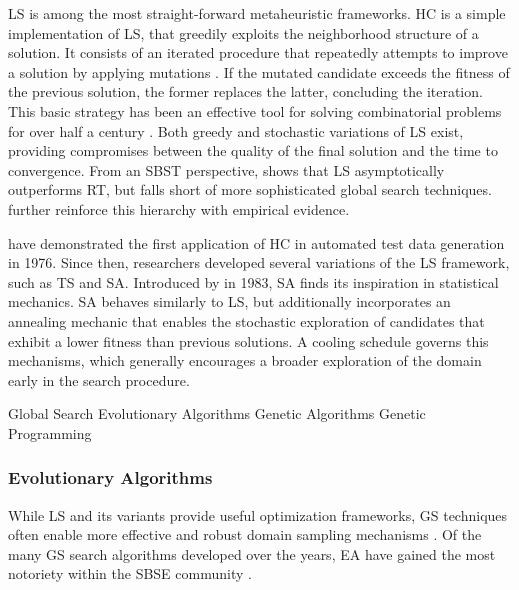 \Gls{LS} is among the most straight-forward
metaheuristic frameworks.
\Gls{HC} is a simple implementation of \gls{LS}, 
that greedily exploits the neighborhood structure 
of a solution.
It consists of an iterated procedure that repeatedly
attempts to improve a solution by applying mutations \cite{selman2006hill}.
If the mutated candidate exceeds the fitness of the previous
solution, the former replaces the latter, concluding the iteration.
This basic strategy has been an effective tool for 
solving combinatorial problems for over half a century \cite{lin1965computer}.
Both greedy and stochastic variations of \gls{LS} exist, providing 
compromises between the quality of the final solution
and the time to convergence.
From an \gls{SBST} perspective, \citet{arcuri2009theoretical} shows
that \gls{LS} asymptotically outperforms \gls{RT}, but falls short of 
more sophisticated global search techniques.
\citet{harman2007theoretical} further reinforce this hierarchy with
empirical evidence.

\citet{miller1976automatic} have demonstrated the
first application of \gls{HC} in automated test data generation in 1976.
Since then, researchers developed several variations of the 
\gls{LS} framework, such as \Gls{TS} \cite{glover1990tabu} and \Gls{SA}.
Introduced by \citet{kirkpatrick1983optimization} in 1983, \gls{SA}
finds its inspiration in statistical mechanics.
\gls{SA} behaves similarly to \gls{LS}, but
additionally incorporates an annealing mechanic that enables
the stochastic exploration of candidates that exhibit a lower
fitness than previous solutions.
A cooling schedule governs this mechanisms, which generally encourages
a broader exploration of the domain early in the search procedure.

 {Global Search}
 {Evolutionary Algorithms}
 {Genetic Algorithms}
 {Genetic Programming}

\subsubsection{Evolutionary Algorithms}

While \gls{LS} and its variants
provide useful optimization frameworks, \Gls{GS} techniques often
enable more effective and robust domain sampling mechanisms \cite{mcminn2004search}.
Of the many \gls{GS} search algorithms developed over the years, \Gls{EA} have gained
the most notoriety within the \gls{SBSE} community \cite{harman2011software}.

